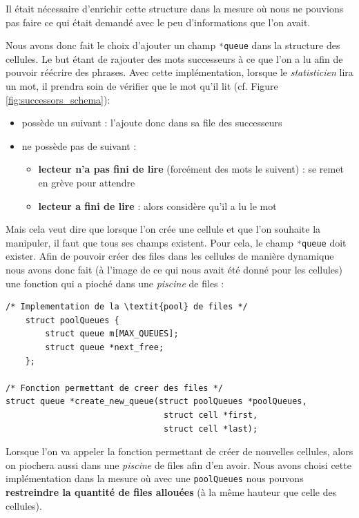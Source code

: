 \documentclass{article}
\newcommand{\inlinecode}[2]{\colorbox{white}{\lstinline[language=#1]$#2$}}
\begin{document}
Il était nécessaire d'enrichir cette structure dans la mesure où nous ne pouvions pas faire ce qui était demandé avec le peu d'informations que l'on avait.

Nous avons donc fait le choix d'ajouter un champ \inlinecode{C}{*queue} dans la structure des cellules. Le but étant de rajouter des mots successeurs à ce que l'on a lu afin de pouvoir réécrire des phrases. Avec cette implémentation, lorsque le \textit{statisticien} lira un mot, il prendra soin de vérifier que le mot qu'il lit (cf. Figure \ref{fig:successors_schema}):
\begin{itemize}
    \item possède un suivant : l'ajoute donc dans sa file des successeurs
    \item ne possède pas de suivant :
    \begin{itemize}
        \item \textbf{lecteur n'a pas fini de lire} (forcément des mots le suivent) : se remet en grève pour attendre
        \item \textbf{lecteur a fini de lire} : alors considère qu'il a lu le mot 
    \end{itemize}
\end{itemize}

Mais cela veut dire que lorsque l'on crée une cellule et que l'on souhaite la manipuler, il faut que tous ses champs existent. Pour cela, le champ \inlinecode{C}{*queue} doit exister. Afin de pouvoir créer des files dans les cellules de manière dynamique nous avons donc fait (à l'image de ce qui nous avait été donné pour les cellules) une fonction qui a pioché dans une \textit{piscine} de files :

\begin{lstlisting}
/* Implementation de la \textit{pool} de files */
    struct poolQueues {
        struct queue m[MAX_QUEUES];
        struct queue *next_free;
    };
 
/* Fonction permettant de creer des files */
struct queue *create_new_queue(struct poolQueues *poolQueues,
                                struct cell *first,
                                struct cell *last);
\end{lstlisting}
\label{lst:create_new_queue}

Lorsque l'on va appeler la fonction permettant de créer de nouvelles cellules, alors on piochera aussi dans une \textit{piscine} de files afin d'en avoir. Nous avons choisi cette implémentation dans la mesure où avec une \inlinecode{C}{poolQueues} nous pouvons \textbf{restreindre la quantité de files allouées} (à la même hauteur que celle des cellules).
\end{document}
